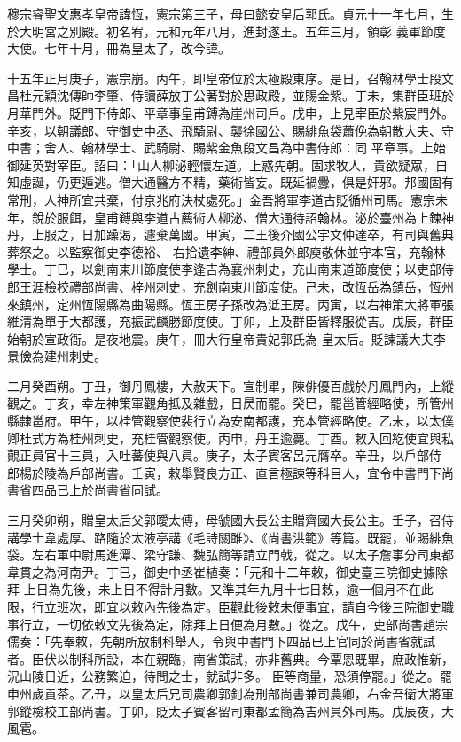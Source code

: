 
\begin{pinyinscope}

 穆宗睿聖文惠孝皇帝諱恆，憲宗第三子，母曰懿安皇后郭氏。貞元十一年七月，生於大明宮之別殿。初名宥，元和元年八月，進封遂王。五年三月，領彰
 義軍節度大使。七年十月，冊為皇太了，改今諱。



 十五年正月庚子，憲宗崩。丙午，即皇帝位於太極殿東序。是日，召翰林學士段文昌杜元穎沈傳師李肇、侍讀薛放丁公著對於思政殿，並賜金紫。丁未，集群臣班於月華門外。貶門下侍郎、平章事皇甫鎛為崖州司戶。戊申，上見宰臣於紫宸門外。辛亥，以朝議郎、守御史中丞、飛騎尉、襲徐國公、賜緋魚袋蕭俛為朝散大夫、守中書；舍人、翰林學士、武騎尉、賜紫金魚段文昌為中書侍郎：同
 平章事。上始御延英對宰臣。詔曰：「山人柳泌輕懷左道。上惑先朝。固求牧人，貴欲疑眾，自知虛誕，仍更遁逃。僧大通醫方不精，藥術皆妄。既延禍釁，俱是奸邪。邦國固有常刑，人神所宜共棄，付京兆府決杖處死。」金吾將軍李道古貶循州司馬。憲宗未年，銳於服餌，皇甫鎛與李道古薦術人柳泌、僧大通待詔翰林。泌於臺州為上鍊神丹，上服之，日加躁渴，遽棄萬國。甲寅，二王後介國公宇文仲達卒，有司與舊典葬祭之。以監察御史李德裕、
 右拾遺李紳、禮部員外郎庾敬休並守本官，充翰林學士。丁巳，以劍南東川節度使李逢吉為襄州刺史，充山南東道節度使；以吏部侍郎王涯檢校禮部尚書、梓州刺史，充劍南東川節度使。己未，改恆岳為鎮岳，恆州來鎮州，定州恆陽縣為曲陽縣。恆王房子孫改為泜王房。丙寅，以右神策大將軍張維清為單于大都護，充振武麟勝節度使。丁卯，上及群臣皆釋服從吉。戊辰，群臣始朝於宣政衙。是夜地震。庚午，冊大行皇帝貴妃郭氏為
 皇太后。貶諫議大夫李景儉為建州刺史。



 二月癸酉朔。丁丑，御丹鳳樓，大赦天下。宣制畢，陳俳優百戲於丹鳳門內，上縱觀之。丁亥，幸左神策軍觀角抵及雜戲，日昃而罷。癸巳，罷邕管經略使，所管州縣隸邕府。甲午，以桂管觀察使裴行立為安南都護，充本管經略使。乙未，以太僕卿杜式方為桂州刺史，充桂管觀察使。丙申，丹王逾薨。丁酉。敕入回紇使宜與私覿正員官十三員，入吐蕃使與八員。庚子，太子賓客呂元膺卒。辛丑，以戶部侍
 郎楊於陵為戶部尚書。壬寅，敕舉賢良方正、直言極諫等科目人，宜令中書門下尚書省四品已上於尚書省同試。



 三月癸卯朔，贈皇太后父郭曖太傅，母虢國大長公主贈齊國大長公主。壬子，召侍講學士韋處厚、路隨於太液亭講《毛詩關雎》、《尚書洪範》等篇。既罷，並賜緋魚袋。左右軍中尉馬進潭、梁守謙、魏弘簡等請立門戟，從之。以太子詹事分司東都韋貫之為河南尹。丁巳，御史中丞崔植奏：「元和十二年敕，御史臺三院御史據除拜
 上日為先後，未上日不得計月數。又準其年九月十七日敕，逾一個月不在此限，行立班次，即宜以敕內先後為定。臣觀此後敕未便事宜，請自今後三院御史職事行立，一切依敕文先後為定，除拜上日便為月數。」從之。戊午，吏部尚書趙宗儒奏：「先奉敕，先朝所放制科舉人，令與中書門下四品已上官同於尚書省就試者。臣伏以制科所設，本在親臨，南省策試，亦非舊典。今覃恩既畢，庶政惟新，況山陵日近，公務繁迫，待問之士，就試非多。
 臣等商量，恐須停罷。」從之。罷申州歲貢茶。乙丑，以皇太后兄司農卿郭釗為刑部尚書兼司農卿，右金吾衛大將軍郭鏦檢校工部尚書。丁卯，貶太子賓客留司東都孟簡為吉州員外司馬。戊辰夜，大風雹。




\end{pinyinscope}
